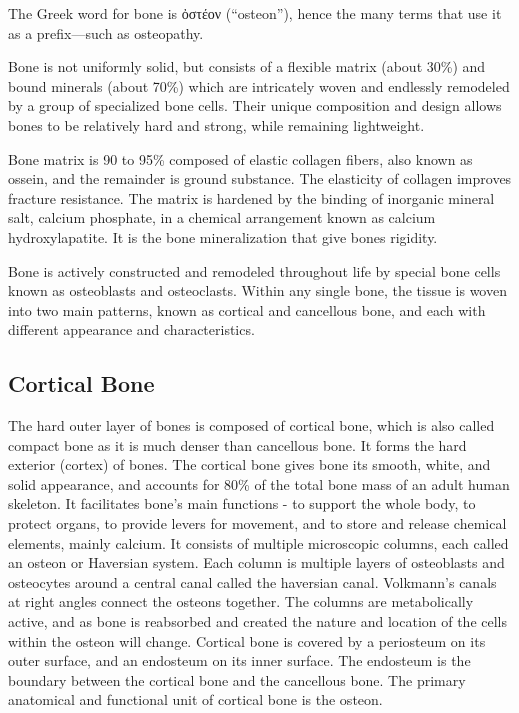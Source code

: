 The Greek word for bone is ὀστέον (``osteon''), hence the many terms that use it as a prefix---such as osteopathy.

Bone is not uniformly solid, but consists of a flexible matrix (about 30\%) and bound minerals (about 70\%) which are intricately woven and endlessly remodeled by a group of specialized bone cells. Their unique composition and design allows bones to be relatively hard and strong, while remaining lightweight.

Bone matrix is 90 to 95\% composed of elastic collagen fibers, also known as ossein, and the remainder is ground substance. The elasticity of collagen improves fracture resistance. The matrix is hardened by the binding of inorganic mineral salt, calcium phosphate, in a chemical arrangement known as calcium hydroxylapatite. It is the bone mineralization that give bones rigidity.

Bone is actively constructed and remodeled throughout life by special bone cells known as osteoblasts and osteoclasts. Within any single bone, the tissue is woven into two main patterns, known as cortical and cancellous bone, and each with different appearance and characteristics.

\hypertarget{cortical-bone}{%
\subsection{Cortical Bone}\label{cortical-bone}}

The hard outer layer of bones is composed of cortical bone, which is also called compact bone as it is much denser than cancellous bone. It forms the hard exterior (cortex) of bones. The cortical bone gives bone its smooth, white, and solid appearance, and accounts for 80\% of the total bone mass of an adult human skeleton. It facilitates bone's main functions - to support the whole body, to protect organs, to provide levers for movement, and to store and release chemical elements, mainly calcium. It consists of multiple microscopic columns, each called an osteon or Haversian system. Each column is multiple layers of osteoblasts and osteocytes around a central canal called the haversian canal. Volkmann's canals at right angles connect the osteons together. The columns are metabolically active, and as bone is reabsorbed and created the nature and location of the cells within the osteon will change. Cortical bone is covered by a periosteum on its outer surface, and an endosteum on its inner surface. The endosteum is the boundary between the cortical bone and the cancellous bone. The primary anatomical and functional unit of cortical bone is the osteon.

